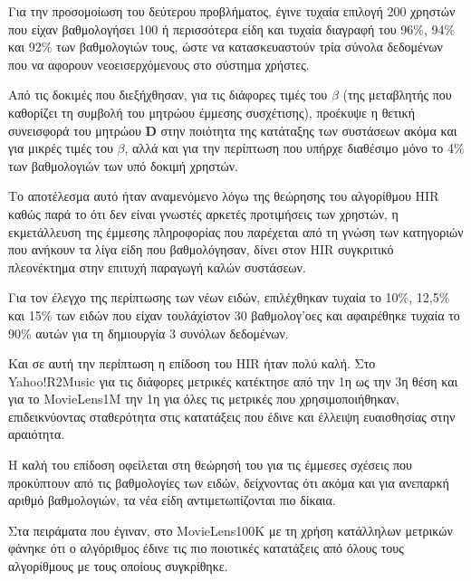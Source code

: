 Για την προσομοίωση του δεύτερου προβλήματος, έγινε τυχαία επιλογή 200 χρηστών που είχαν βαθμολογήσει 100 ή περισσότερα είδη και τυχαία διαγραφή του 96\%, 94\% και 92\% των βαθμολογιών τους, ώστε να κατασκευαστούν τρία σύνολα δεδομένων που να αφορουν νεοεισερχόμενους στο σύστημα χρήστες. \par
Από τις δοκιμές που διεξήχθησαν, για τις διάφορες τιμές του $\beta$ (της μεταβλητής που καθορίζει τη συμβολή του μητρώου έμμεσης συσχέτισης), προέκυψε η θετική συνεισφορά του μητρώου $\mathbf{D}$ στην ποιότητα της κατάταξης των συστάσεων ακόμα και για μικρές τιμές του $\beta$, αλλά και για την περίπτωση που υπήρχε διαθέσιμο μόνο το 4\% των βαθμολογιών των υπό δοκιμή χρηστών. \par
Το αποτέλεσμα αυτό ήταν αναμενόμενο λόγω της θεώρησης του αλγορίθμου {\en HIR} καθώς παρά το ότι δεν είναι γνωστές αρκετές προτιμήσεις των χρηστών, η εκμετάλλευση της έμμεσης πληροφορίας που παρέχεται από τη γνώση των κατηγοριών που ανήκουν τα λίγα είδη που βαθμολόγησαν, δίνει στον {\en HIR} συγκριτικό πλεονέκτημα στην επιτυχή παραγωγή καλών συστάσεων. \par
Για τον έλεγχο της περίπτωσης των νέων ειδών, επιλέχθηκαν τυχαία το 10\%, 12,5\% και 15\% των ειδών που είχαν τουλάχίστον 30 βαθμολογ'οες και αφαιρέθηκε τυχαία το 90\% αυτών για τη δημιουργία 3 συνόλων δεδομένων. \par
Και σε αυτή την περίπτωση η επίδοση του {\en HIR} ήταν πολύ καλή. Στο {\en Yahoo!R2Music} για τις διάφορες μετρικές κατέκτησε από την 1η ως την 3η θέση και για το {\en MovieLens1M} την 1η για όλες τις μετρικές που χρησιμοποιήθηκαν, επιδεικνύοντας σταθερότητα στις κατατάξεις που έδινε και έλλειψη ευαισθησίας στην αραιότητα. \par
Η καλή του επίδοση οφείλεται στη θεώρησή του για τις έμμεσες σχέσεις που προκύπτουν από τις βαθμολογίες των ειδών, δείχνοντας ότι ακόμα και για ανεπαρκή αριθμό βαθμολογιών, τα νέα είδη αντιμετωπίζονται πιο δίκαια. \par
Στα πειράματα που έγιναν, στο {\en MovieLens100K} με τη χρήση κατάλληλων μετρικών φάνηκε ότι ο αλγόριθμος έδινε τις πιο ποιοτικές κατατάξεις από όλους τους αλγορίθμους με τους οποίους συγκρίθηκε. 
